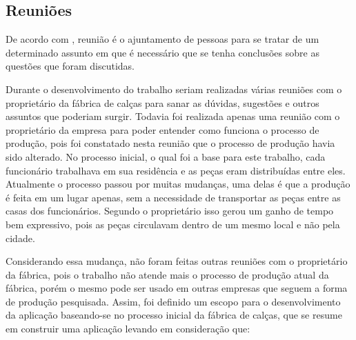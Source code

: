 \subsection{Reuniões}
\par De acordo com , reunião é o ajuntamento de
pessoas para se tratar de um determinado assunto em que é necessário que se
tenha conclusões sobre as questões que foram discutidas.

\par Durante o desenvolvimento do trabalho seriam realizadas várias reuniões
com o proprietário da fábrica de calças para sanar as dúvidas, sugestões e
outros assuntos que poderiam surgir. Todavia foi realizada apenas uma reunião com o proprietário
da empresa para poder entender como funciona o processo de produção, pois foi constatado nesta reunião que o
processo de produção havia sido alterado. No processo inicial, o qual foi a base
para este trabalho, cada funcionário trabalhava em sua residência e as peças eram distribuídas entre eles. Atualmente o processo
passou por muitas mudanças, uma delas é que a produção é feita em um lugar
apenas, sem a necessidade de transportar as peças entre as casas dos
funcionários. Segundo o proprietário isso gerou um ganho de tempo bem
expressivo, pois as peças circulavam dentro de um mesmo local e não pela cidade. 

\par Considerando essa mudança, não foram feitas outras reuniões com o
proprietário da fábrica, pois o trabalho não atende mais o processo de produção
atual da fábrica, porém o mesmo pode ser usado em outras empresas que seguem a
forma de produção pesquisada. Assim, foi definido um escopo para o desenvolvimento da aplicação baseando-se no 
processo inicial da fábrica de calças, que se resume em construir uma aplicação levando em consideração que:


